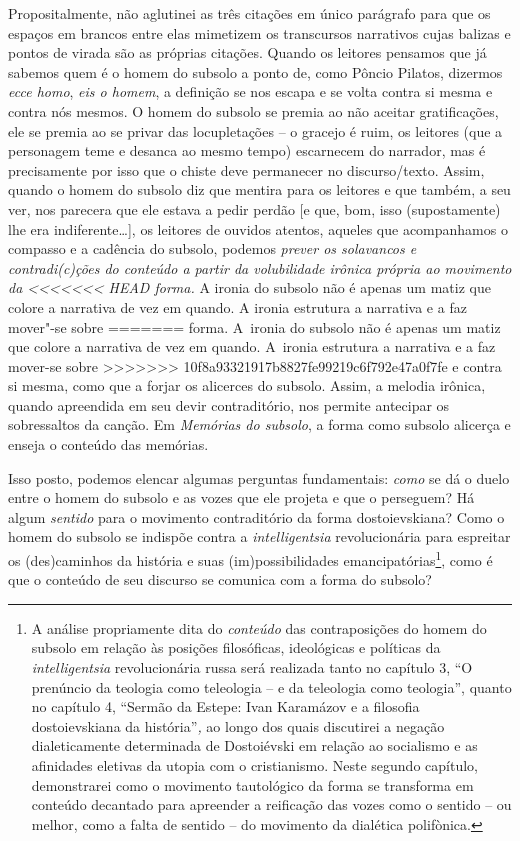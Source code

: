 {{Propositalmente, não aglutinei as três citações em único parágrafo para
que os espaços em brancos entre elas mimetizem os transcursos narrativos
cujas balizas e pontos de virada são as próprias citações. Quando os
leitores pensamos que já sabemos quem é o homem do subsolo a ponto de,
como Pôncio Pilatos, dizermos \emph{ecce homo}, \emph{eis o homem}, a
definição se nos escapa e se volta contra si mesma e contra nós mesmos.
O homem do subsolo se premia ao não aceitar gratificações, ele se premia
ao se privar das locupletações -- o gracejo é ruim, os leitores (que a
personagem teme e desanca ao mesmo tempo) escarnecem do narrador, mas é
precisamente por isso que o chiste deve permanecer no discurso/texto.
Assim, quando o homem do subsolo diz que mentira para os leitores e que
também, a seu ver, nos parecera que ele estava a pedir perdão {[}e que,
bom, isso (supostamente) lhe era indiferente\ldots{}{]}, os leitores de
ouvidos atentos, aqueles que acompanhamos o compasso e a cadência do
subsolo, podemos \emph{prever os solavancos e contradi(c)ções do
conteúdo a partir da volubilidade irônica própria ao movimento da
<<<<<<< HEAD
forma.} A ironia do subsolo não é apenas um matiz que colore a narrativa
de vez em quando. A ironia estrutura a narrativa e a faz mover"-se sobre
=======
forma.} A~ironia do subsolo não é apenas um matiz que colore a narrativa
de vez em quando. A~ironia estrutura a narrativa e a faz mover-se sobre
>>>>>>> 10f8a93321917b8827fe99219c6f792e47a0f7fe
e contra si mesma, como que a forjar os alicerces do subsolo. Assim, a
melodia irônica, quando apreendida em seu devir contraditório, nos
permite antecipar os sobressaltos da canção. Em \emph{Memórias do
subsolo}, a forma como subsolo alicerça e enseja o conteúdo das
memórias.

Isso posto, podemos elencar algumas perguntas fundamentais: \emph{como}
se dá o duelo entre o homem do subsolo e as vozes que ele projeta e que
o perseguem? Há algum \emph{sentido} para o movimento contraditório da
forma dostoievskiana? Como o homem do subsolo se indispõe contra a
\emph{intelligentsia} revolucionária para espreitar os (des)caminhos da
história e suas (im)possibilidades emancipatórias\footnote{A análise
  propriamente dita do \emph{conteúdo} das contraposições do homem do
  subsolo em relação às posições filosóficas, ideológicas e políticas da
  \emph{intelligentsia} revolucionária russa será realizada tanto no
  capítulo 3, ``O prenúncio da teologia como teleologia -- e da
  teleologia como teologia'', quanto no capítulo 4, ``Sermão da Estepe:
  Ivan Karamázov e a filosofia dostoievskiana da história''\emph{,} ao
  longo dos quais discutirei a negação dialeticamente determinada de
  Dostoiévski em relação ao socialismo e as afinidades eletivas da
  utopia com o cristianismo. Neste segundo capítulo, demonstrarei como o
  movimento tautológico da forma se transforma em conteúdo decantado
  para apreender a reificação das vozes como o sentido -- ou melhor,
  como a falta de sentido -- do movimento da dialética polifònica.},
como é que o conteúdo de seu discurso se comunica com a forma do
subsolo?

}
